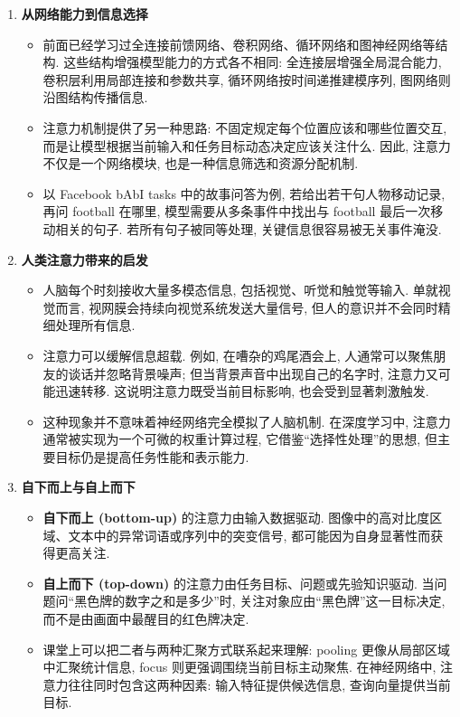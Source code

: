 \documentclass{../nndlcourse}
\begin{document}
\begin{enumerate}
  \item \textbf{从网络能力到信息选择}
    \begin{itemize}
      \item 前面已经学习过全连接前馈网络、卷积网络、循环网络和图神经网络等结构. 这些结构增强模型能力的方式各不相同: 全连接层增强全局混合能力, 卷积层利用局部连接和参数共享, 循环网络按时间递推建模序列, 图网络则沿图结构传播信息.
      \item 注意力机制提供了另一种思路: 不固定规定每个位置应该和哪些位置交互, 而是让模型根据当前输入和任务目标动态决定应该关注什么. 因此, 注意力不仅是一个网络模块, 也是一种信息筛选和资源分配机制.
      \item 以 Facebook bAbI tasks 中的故事问答为例, 若给出若干句人物移动记录, 再问 football 在哪里, 模型需要从多条事件中找出与 football 最后一次移动相关的句子. 若所有句子被同等处理, 关键信息很容易被无关事件淹没.
    \end{itemize}
  \item \textbf{人类注意力带来的启发}
    \begin{itemize}
      \item 人脑每个时刻接收大量多模态信息, 包括视觉、听觉和触觉等输入. 单就视觉而言, 视网膜会持续向视觉系统发送大量信号, 但人的意识并不会同时精细处理所有信息.
      \item 注意力可以缓解信息超载. 例如, 在嘈杂的鸡尾酒会上, 人通常可以聚焦朋友的谈话并忽略背景噪声; 但当背景声音中出现自己的名字时, 注意力又可能迅速转移. 这说明注意力既受当前目标影响, 也会受到显著刺激触发.
      \item 这种现象并不意味着神经网络完全模拟了人脑机制. 在深度学习中, 注意力通常被实现为一个可微的权重计算过程, 它借鉴“选择性处理”的思想, 但主要目标仍是提高任务性能和表示能力.
    \end{itemize}
  \item \textbf{自下而上与自上而下}
    \begin{itemize}
      \item \textbf{自下而上 (bottom-up)} 的注意力由输入数据驱动. 图像中的高对比度区域、文本中的异常词语或序列中的突变信号, 都可能因为自身显著性而获得更高关注.
      \item \textbf{自上而下 (top-down)} 的注意力由任务目标、问题或先验知识驱动. 当问题问“黑色牌的数字之和是多少”时, 关注对象应由“黑色牌”这一目标决定, 而不是由画面中最醒目的红色牌决定.
      \item 课堂上可以把二者与两种汇聚方式联系起来理解: pooling 更像从局部区域中汇聚统计信息, focus 则更强调围绕当前目标主动聚焦. 在神经网络中, 注意力往往同时包含这两种因素: 输入特征提供候选信息, 查询向量提供当前目标.

\end{itemize}
\end{enumerate}
\end{document}
